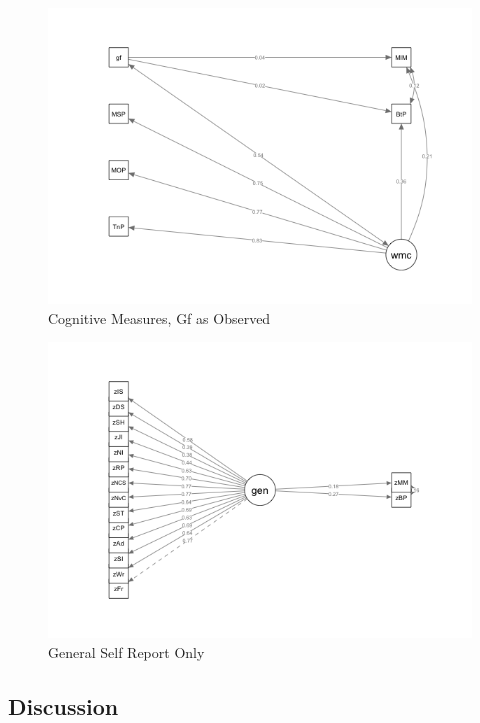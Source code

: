 \documentclass[]{book}
\begin{document}
\begin{figure}

{\centering \includegraphics[width=1\linewidth]{img/sem4} 

}

\caption{Cognitive Measures, Gf as Observed}\label{fig:model4}
\end{figure}

\begin{figure}

{\centering \includegraphics[width=1\linewidth]{img/sem5} 

}

\caption{General Self Report Only}\label{fig:model5}
\end{figure}

\hypertarget{discussion}{%
\subsection{Discussion}\label{discussion}}
\end{document}
